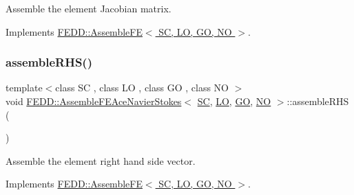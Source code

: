 Assemble the element Jacobian matrix. 



Implements \hyperlink{classFEDD_1_1AssembleFE_af48b450dfdf6cea7beeb24feef7dc10f}{F\+E\+D\+D\+::\+Assemble\+F\+E$<$ S\+C, L\+O, G\+O, N\+O $>$}.

\mbox{\label{classFEDD_1_1AssembleFEAceNavierStokes_af42c6437fdac694ffbdccd12f8c581f2}} 
\subsubsection{\texorpdfstring{assemble\+R\+H\+S()}{assembleRHS()}}
{\footnotesize\ttfamily template$<$class SC , class LO , class GO , class NO $>$ \\
void \hyperlink{classFEDD_1_1AssembleFEAceNavierStokes}{F\+E\+D\+D\+::\+Assemble\+F\+E\+Ace\+Navier\+Stokes}$<$ \hyperlink{fe__test__laplace_8cpp_a79c7e86a57edbb2a5a53242bcd04e41e}{SC}, \hyperlink{fe__test__laplace_8cpp_ad6a38c9f07d3fd633eefca5bccad8410}{LO}, \hyperlink{fe__test__laplace_8cpp_afa2946b509009b4f45eb04bd8c5b27d9}{GO}, \hyperlink{fe__test__laplace_8cpp_a5e24f37b28787429872b6ecb1d0417ce}{NO} $>$\+::assemble\+R\+HS (\begin{DoxyParamCaption}{ }\end{DoxyParamCaption})\hspace{0.3cm}{\ttfamily [virtual]}}



Assemble the element right hand side vector. 



Implements \hyperlink{classFEDD_1_1AssembleFE_a43f18446faadb45bb4e2eae4f82ba9ba}{F\+E\+D\+D\+::\+Assemble\+F\+E$<$ S\+C, L\+O, G\+O, N\+O $>$}.

\mbox{\label{classFEDD_1_1AssembleFEAceNavierStokes_a29d454fb17d4f9a878471fedb3317f2d}} 
